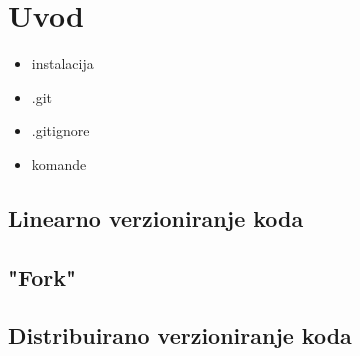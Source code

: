 \chapter*{Uvod}

\begin{itemize}
   \item instalacija
   \item .git
   \item .gitignore
   \item komande
\end{itemize}

\section*{Linearno verzioniranje koda}

\section*{"Fork"}

\section*{Distribuirano verzioniranje koda}

